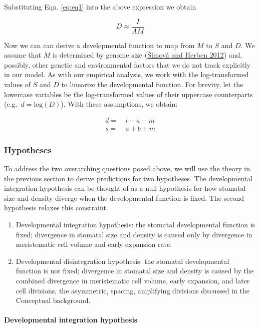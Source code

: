 \documentclass[
  12pt,
]{article}
\begin{document}
Substituting Eqn. \ref{eq:eq1} into the above expression we obtain

\[D \approx \frac{I}{A M}\]

Now we can can derive a developmental function to map from \(M\) to \(S\) and \(D\). We assume that \(M\) is determined by genome size (\protect\hyperlink{ref-simova_geometrical_2012}{Šímová and Herben 2012}) and, possibly, other genetic and environmental factors that we do not track explicitly in our model. As with our empirical analysis, we work with the log-transformed values of \(S\) and \(D\) to linearize the developmental function. For brevity, let the lowercase variables be the log-transformed values of their uppercase counterparts (e.g.~\(d = \textrm{log}(D)\)). With these assumptions, we obtain:

\begin{align}
  d = &~i - a - m \\
  s = &~a + b + m 
  \label{eq:dev-fun}
\end{align}

\hypertarget{hypotheses}{%
\subsubsection{Hypotheses}\label{hypotheses}}

To address the two overarching questions posed above, we will use the theory in the previous section to derive predictions for two hypotheses. The developmental integration hypothesis can be thought of as a null hypothesis for how stomatal size and density diverge when the developmental function is fixed. The second hypothesis relaxes this constraint.

\begin{enumerate}
\def\labelenumi{\arabic{enumi}.}
\item
  Developmental integration hypothesis: the stomatal developmental function is fixed; divergence in stomatal size and density is caused only by divergence in meristematic cell volume and early expansion rate.
\item
  Developmental disintegration hypothesis: the stomatal developmental function is not fixed; divergence in stomatal size and density is caused by the combined divergence in meristematic cell volume, early expansion, and later cell divisions, the asymmetric, spacing, amplifying divisions discussed in the Conceptual background.
\end{enumerate}

\hypertarget{developmental-integration-hypothesis}{%
\paragraph{Developmental integration hypothesis}\label{developmental-integration-hypothesis}}
\end{document}
